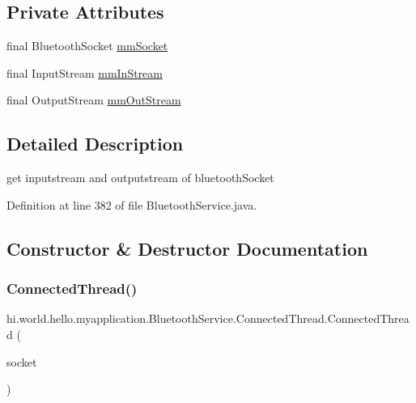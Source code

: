 \subsection*{Private Attributes}
\begin{DoxyCompactItemize}
\item 
final Bluetooth\+Socket \mbox{\hyperlink{classhi_1_1world_1_1hello_1_1myapplication_1_1_bluetooth_service_1_1_connected_thread_accbbef3426eff4d76f627fde819e8962}{mm\+Socket}}
\item 
final Input\+Stream \mbox{\hyperlink{classhi_1_1world_1_1hello_1_1myapplication_1_1_bluetooth_service_1_1_connected_thread_a309e4982310f146879992a28ef82f7aa}{mm\+In\+Stream}}
\item 
final Output\+Stream \mbox{\hyperlink{classhi_1_1world_1_1hello_1_1myapplication_1_1_bluetooth_service_1_1_connected_thread_a789142080b296c7e957149ad09ae6d12}{mm\+Out\+Stream}}
\end{DoxyCompactItemize}


\subsection{Detailed Description}
get inputstream and outputstream of bluetooth\+Socket 

Definition at line 382 of file Bluetooth\+Service.\+java.



\subsection{Constructor \& Destructor Documentation}
\mbox{\label{classhi_1_1world_1_1hello_1_1myapplication_1_1_bluetooth_service_1_1_connected_thread_a124e4a4d8a085506222d036222f8c7ad}} 
\subsubsection{\texorpdfstring{ConnectedThread()}{ConnectedThread()}}
{\footnotesize\ttfamily hi.\+world.\+hello.\+myapplication.\+Bluetooth\+Service.\+Connected\+Thread.\+Connected\+Thread (\begin{DoxyParamCaption}\item[{Bluetooth\+Socket}]{socket }\end{DoxyParamCaption})}



